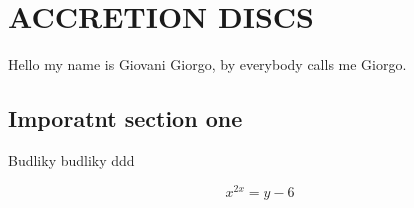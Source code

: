 \chapter{ACCRETION DISCS}
Hello my name is Giovani Giorgo, by everybody calls me Giorgo.

\section{Imporatnt section one}

Budliky budliky ddd

\begin{equation}
	x^{2x} = y - 6
\end{equation}

\thispagestyle{empty}
